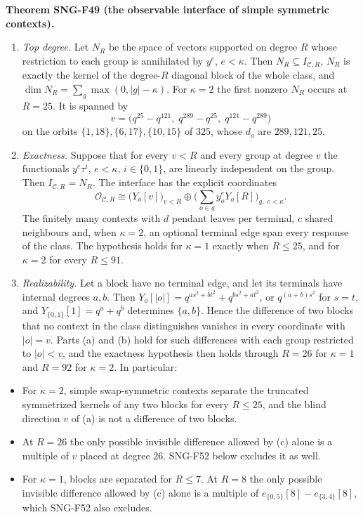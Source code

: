 \documentclass[
  11pt,
  a4paper,
]{report}
\providecommand{\tightlist}{%
  \setlength{\itemsep}{0pt}\setlength{\parskip}{0pt}}
\begin{document}
\textbf{Theorem SNG-F49 (the observable interface of simple symmetric
contexts).}

\begin{enumerate}
\def\labelenumi{(\alph{enumi})}
\item
  \emph{Top degree.} Let \(N_R\) be the space of vectors supported on
  degree \(R\) whose restriction to each group is annihilated by
  \(y^e\), \(e<\kappa\). Then \(N_R\subseteq I_{\mathcal C,R}\), \(N_R\)
  is exactly the kernel of the degree-\(R\) diagonal block of the whole
  class, and \(\dim N_R=\sum_g\max(0,|g|-\kappa)\). For \(\kappa=2\) the
  first nonzero \(N_R\) occurs at \(R=25\). It is spanned by \[
  v=\bigl(q^{25}-q^{121},\;q^{289}-q^{25},\;q^{121}-q^{289}\bigr)
  \] on the orbits \(\{1,18\},\{6,17\},\{10,15\}\) of \(325\), whose
  \(d_o\) are \(289,121,25\).
\item
  \emph{Exactness.} Suppose that for every \(v<R\) and every group at
  degree \(v\) the functionals \(y^e\tau^i\), \(e<\kappa\),
  \(i\in\{0,1\}\), are linearly independent on the group. Then
  \(I_{\mathcal C,R}=N_R\). The interface has the explicit coordinates
  \[
  \mathcal O_{\mathcal C,R}\cong\bigl(Y_o[v]\bigr)_{v<R}\oplus\bigl(\textstyle\sum_{o\in g}y_o^eY_o[R]\bigr)_{g,\;e<\kappa}.
  \] The finitely many contexts with \(d\) pendant leaves per terminal,
  \(c\) shared neighbours and, when \(\kappa=2\), an optional terminal
  edge span every response of the class. The hypothesis holds for
  \(\kappa=1\) exactly when \(R\le25\), and for \(\kappa=2\) for every
  \(R\le91\).
\item
  \emph{Realizability.} Let a block have no terminal edge, and let its
  terminals have internal degrees \(a,b\). Then
  \(Y_o[|o|]=q^{as^2+bt^2}+q^{bs^2+at^2}\), or \(q^{(a+b)s^2}\) for
  \(s=t\), and \(Y_{\{0,1\}}[1]=q^a+q^b\) determines \(\{a,b\}\). Hence
  the difference of two blocks that no context in the class
  distinguishes vanishes in every coordinate with \(|o|=v\). Parts (a)
  and (b) hold for such differences with each group restricted to
  \(|o|<v\), and the exactness hypothesis then holds through \(R=26\)
  for \(\kappa=1\) and \(R=92\) for \(\kappa=2\). In particular:
\end{enumerate}

\begin{itemize}
\tightlist
\item
  For \(\kappa=2\), simple swap-symmetric contexts separate the
  truncated symmetrized kernels of any two blocks for every \(R\le25\),
  and the blind direction \(v\) of (a) is not a difference of two
  blocks.
\item
  At \(R=26\) the only possible invisible difference allowed by (c)
  alone is a multiple of \(v\) placed at degree \(26\). SNG-F52 below
  excludes it as well.
\item
  For \(\kappa=1\), blocks are separated for \(R\le7\). At \(R=8\) the
  only possible invisible difference allowed by (c) alone is a multiple
  of \(e_{\{0,5\}}[8]-e_{\{3,4\}}[8]\), which SNG-F52 also excludes.
\end{itemize}
\end{document}
